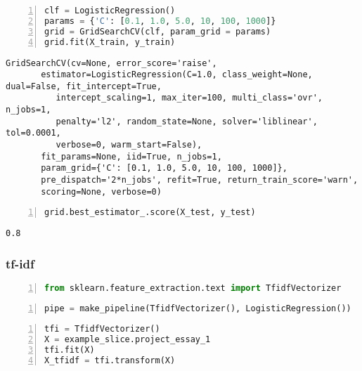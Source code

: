 \documentclass[10pt,parskip=half,
	toc=sectionentrywithdots,
	bibliography=totocnumbered,
	captions=tableheading,numbers=noendperiod]{scrartcl}
\begin{document}
\begin{lstlisting}[language=Python,numbers=left,xleftmargin=20pt,xrightmargin=5pt,belowskip=5pt,aboveskip=5pt]
clf = LogisticRegression()
params = {'C': [0.1, 1.0, 5.0, 10, 100, 1000]}
grid = GridSearchCV(clf, param_grid = params)
grid.fit(X_train, y_train)
\end{lstlisting}

\begin{lstlisting}[language={},postbreak={},numbers=none,xrightmargin=7pt,breakindent=0pt,aboveskip=5pt,belowskip=5pt]
GridSearchCV(cv=None, error_score='raise',
       estimator=LogisticRegression(C=1.0, class_weight=None, dual=False, fit_intercept=True,
          intercept_scaling=1, max_iter=100, multi_class='ovr', n_jobs=1,
          penalty='l2', random_state=None, solver='liblinear', tol=0.0001,
          verbose=0, warm_start=False),
       fit_params=None, iid=True, n_jobs=1,
       param_grid={'C': [0.1, 1.0, 5.0, 10, 100, 1000]},
       pre_dispatch='2*n_jobs', refit=True, return_train_score='warn',
       scoring=None, verbose=0)
\end{lstlisting}

\begin{lstlisting}[language=Python,numbers=left,xleftmargin=20pt,xrightmargin=5pt,belowskip=5pt,aboveskip=5pt]
grid.best_estimator_.score(X_test, y_test)
\end{lstlisting}

\begin{lstlisting}[language={},postbreak={},numbers=none,xrightmargin=7pt,breakindent=0pt,aboveskip=5pt,belowskip=5pt]
0.8
\end{lstlisting}

\subsubsection{tf-idf}\label{tf-idf}

\begin{lstlisting}[language=Python,numbers=left,xleftmargin=20pt,xrightmargin=5pt,belowskip=5pt,aboveskip=5pt]
from sklearn.feature_extraction.text import TfidfVectorizer
\end{lstlisting}

\begin{lstlisting}[language=Python,numbers=left,xleftmargin=20pt,xrightmargin=5pt,belowskip=5pt,aboveskip=5pt]
pipe = make_pipeline(TfidfVectorizer(), LogisticRegression())
\end{lstlisting}

\begin{lstlisting}[language=Python,numbers=left,xleftmargin=20pt,xrightmargin=5pt,belowskip=5pt,aboveskip=5pt]
tfi = TfidfVectorizer()
X = example_slice.project_essay_1
tfi.fit(X)
X_tfidf = tfi.transform(X)
\end{lstlisting}
\end{document}
